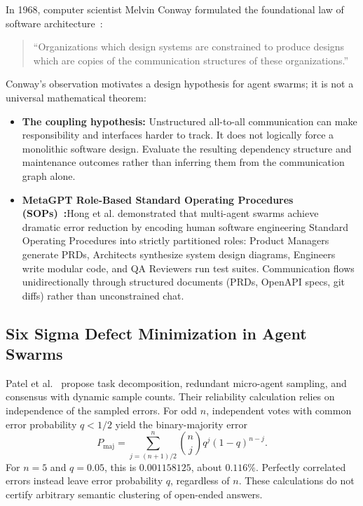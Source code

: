 \documentclass[11pt,a4paper]{article}
\begin{document}
In 1968, computer scientist Melvin Conway formulated the foundational law of software architecture~:
\begin{quote}
``Organizations which design systems are constrained to produce designs which are copies of the communication structures of these organizations.''
\end{quote}
Conway's observation motivates a design hypothesis for agent swarms; it is not a universal mathematical theorem:
\begin{itemize}[leftmargin=1.8em,itemsep=2pt]
  \item \textbf{The coupling hypothesis:} Unstructured all-to-all communication can make responsibility and interfaces harder to track. It does not logically force a monolithic software design. Evaluate the resulting dependency structure and maintenance outcomes rather than inferring them from the communication graph alone.
  \item \textbf{MetaGPT Role-Based Standard Operating Procedures (SOPs)~:}\enspace Hong et al. demonstrated that multi-agent swarms achieve dramatic error reduction by encoding human software engineering Standard Operating Procedures into strictly partitioned roles: Product Managers generate PRDs, Architects synthesize system design diagrams, Engineers write modular code, and QA Reviewers run test suites. Communication flows unidirectionally through structured documents (PRDs, OpenAPI specs, git diffs) rather than unconstrained chat.
\end{itemize}

\subsection{Six Sigma Defect Minimization in Agent Swarms}

Patel et al.~ propose task decomposition, redundant micro-agent sampling, and consensus with dynamic sample counts. Their reliability calculation relies on independence of the sampled errors. For odd $n$, independent votes with common error probability $q<1/2$ yield the binary-majority error
\begin{equation}
P_{\mathrm{maj}}=\sum_{j=(n+1)/2}^{n}{n\choose j}q^j(1-q)^{n-j}.
\end{equation}
For $n=5$ and $q=0.05$, this is $0.001158125$, about $0.116\%$. Perfectly correlated errors instead leave error probability $q$, regardless of $n$. These calculations do not certify arbitrary semantic clustering of open-ended answers.
\end{document}
